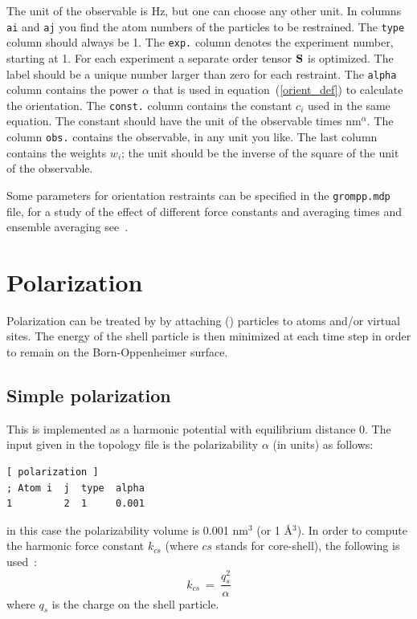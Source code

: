 The unit of the observable is Hz, but one can choose any other unit.
In columns {\tt
ai} and {\tt aj} you find the atom numbers of the particles to be
restrained. The {\tt type} column should always be 1.
The {\tt exp.} column denotes the experiment number, starting
at 1. For each experiment a separate order tensor ${\mathbf S}$
is optimized. The label should be a unique number larger than zero
for each restraint. The {\tt alpha} column contains the power $\alpha$ 
that is used in equation~(\ref{orient_def}) to calculate the orientation.
The {\tt const.} column contains the constant $c_i$ used in the same
equation. The constant should have the unit of the observable times
nm$^\alpha$. The column {\tt obs.} contains the observable, in any
unit you like. The last column contains the weights $w_i$; the unit
should be the inverse of the square of the unit of the observable.

Some parameters for orientation restraints can be specified in the
{\tt grompp.mdp} file, for a study of the effect of different
force constants and averaging times and ensemble averaging see~\cite{Hess2003}.

\section{Polarization}
Polarization can be treated by {\gromacs} by attaching
 () particles to atoms and/or
virtual sites. The energy of the shell particle is then minimized at
each time step in order to remain on the Born-Oppenheimer surface.

\subsection{Simple polarization}
This is implemented as a harmonic potential with equilibrium distance
0.
The input given in the topology file is the polarizability $\alpha$ (in
{\gromacs} units) as follows:
\begin{verbatim}
[ polarization ]
; Atom i  j  type  alpha
1         2  1     0.001
\end{verbatim}
in this case the polarizability volume is 0.001 nm$^3$ (or 1
{\AA$^3$}). In order to compute the harmonic force constant $k_{cs}$
(where $cs$ stands for core-shell), the
following is used~\cite{Maaren2001a}:
\begin{equation}
k_{cs} ~=~ \frac{q_s^2}{\alpha}
\end{equation}
where $q_s$ is the charge on the shell particle.

